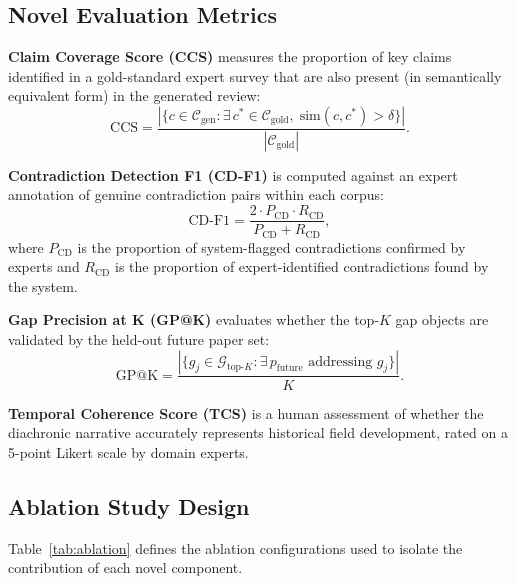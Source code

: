 \documentclass{llncs}
\begin{document}
\subsection{Novel Evaluation Metrics}

\textbf{Claim Coverage Score (CCS)} measures the proportion of key claims
identified in a gold-standard expert survey that are also present (in
semantically equivalent form) in the generated review:
\begin{equation}
  \text{CCS} = \frac{|\{c \in \mathcal{C}_{\text{gen}} :
    \exists\, c^* \in \mathcal{C}_{\text{gold}},\;
    \text{sim}(c,c^*) > \delta\}|}{|\mathcal{C}_{\text{gold}}|}.
\end{equation}

\textbf{Contradiction Detection F1 (CD-F1)} is computed against an expert
annotation of genuine contradiction pairs within each corpus:
\begin{equation}
  \text{CD-F1} = \frac{2 \cdot P_{\text{CD}} \cdot R_{\text{CD}}}
                     {P_{\text{CD}} + R_{\text{CD}}},
\end{equation}
where $P_{\text{CD}}$ is the proportion of system-flagged contradictions
confirmed by experts and $R_{\text{CD}}$ is the proportion of
expert-identified contradictions found by the system.

\textbf{Gap Precision at K (GP@K)} evaluates whether the top-$K$ gap objects
are validated by the held-out future paper set:
\begin{equation}
  \text{GP@K} = \frac{|\{g_j \in \mathcal{G}_{\text{top-}K} :
    \exists\, p_{\text{future}} \text{ addressing } g_j\}|}{K}.
\end{equation}

\textbf{Temporal Coherence Score (TCS)} is a human assessment of whether the
diachronic narrative accurately represents historical field development,
rated on a 5-point Likert scale by domain experts.

\subsection{Ablation Study Design}

Table~\ref{tab:ablation} defines the ablation configurations used to isolate
the contribution of each novel component.
\end{document}
